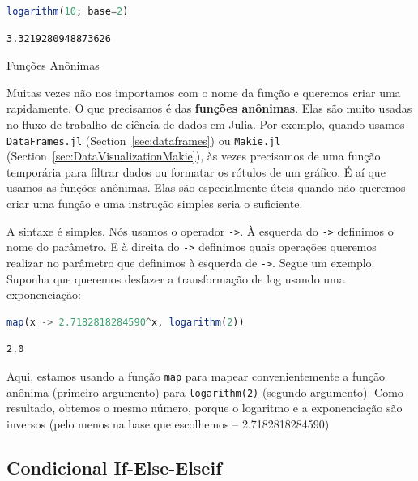 \documentclass[
  notoc %
]{tufte-book}
\makeatletter
\newcommand{\passthrough}[1]{#1}
\renewcommand\subsubsection{%
\@startsection{subsubsection}{3}{\z@ }{-3.25ex\@plus -1ex \@minus -.2ex}{1.5ex \@plus .2ex}{\normalfont \normalsize \bfseries }
}
\makeatother
\begin{document}
\begin{lstlisting}[language=Julia]
logarithm(10; base=2)
\end{lstlisting}

\begin{lstlisting}[language=Output]
3.3219280948873626
\end{lstlisting}

\hypertarget{sec:function_anonymous}{%
\subsubsection{Funções Anônimas}\label{sec:function_anonymous}}

Muitas vezes não nos importamos com o nome da função e queremos criar
uma rapidamente. O que precisamos é das \textbf{funções anônimas}. Elas
são muito usadas no fluxo de trabalho de ciência de dados em Julia. Por
exemplo, quando usamos \passthrough{\lstinline!DataFrames.jl!}
(Section~\ref{sec:dataframes}) ou \passthrough{\lstinline!Makie.jl!}
(Section~\ref{sec:DataVisualizationMakie}), às vezes precisamos de uma
função temporária para filtrar dados ou formatar os rótulos de um
gráfico. É aí que usamos as funções anônimas. Elas são especialmente
úteis quando não queremos criar uma função e uma instrução simples seria
o suficiente.

A sintaxe é simples. Nós usamos o operador \passthrough{\lstinline!->!}.
À esquerda do \passthrough{\lstinline!->!} definimos o nome do
parâmetro. E à direita do \passthrough{\lstinline!->!} definimos quais
operações queremos realizar no parâmetro que definimos à esquerda de
\passthrough{\lstinline!->!}. Segue um exemplo. Suponha que queremos
desfazer a transformação de log usando uma exponenciação:

\begin{lstlisting}[language=Julia]
map(x -> 2.7182818284590^x, logarithm(2))
\end{lstlisting}

\begin{lstlisting}[language=Output]
2.0
\end{lstlisting}

Aqui, estamos usando a função \passthrough{\lstinline!map!} para mapear
convenientemente a função anônima (primeiro argumento) para
\passthrough{\lstinline!logarithm(2)!} (segundo argumento). Como
resultado, obtemos o mesmo número, porque o logaritmo e a exponenciação
são inversos (pelo menos na base que escolhemos -- 2.7182818284590)

\hypertarget{sec:conditionals}{%
\subsection{Condicional If-Else-Elseif}\label{sec:conditionals}}
\end{document}
